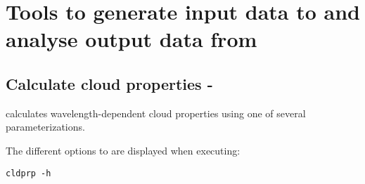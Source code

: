 \section{Tools to generate input data to and analyse output data from }




\subsection{Calculate cloud properties - }

 calculates wavelength-dependent cloud properties 
using one of several parameterizations.

The different options to  are displayed when executing:

\begin{verbatim}
cldprp -h
\end{verbatim}






   



